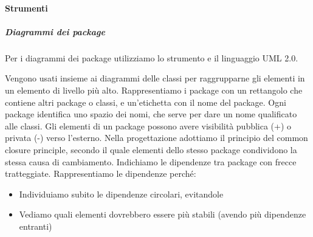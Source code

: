         \paragraph{Strumenti}

		\subparagraph{Diagrammi dei package}\label{PP:Sviluppo:DiagrammiPackage}
        Per i diagrammi dei package utilizziamo lo strumento  e il linguaggio UML 2.0.\par
        Vengono usati insieme ai diagrammi delle classi per raggrupparne gli elementi in un elemento di livello più alto.
        Rappresentiamo i package con un rettangolo che contiene altri package o classi, e un'etichetta con il nome del package.
        Ogni package identifica uno spazio dei nomi, che serve per dare un nome qualificato alle classi.
        Gli elementi di un package possono avere visibilità pubblica (+) o privata (-) verso l'esterno.
		Nella progettazione adottiamo il principio del common closure principle, secondo il quale elementi dello stesso
		package condividono la stessa causa di cambiamento.
        Indichiamo le dipendenze tra package con frecce tratteggiate.
        Rappresentiamo le dipendenze perché:
        \begin{itemize}
            \item Individuiamo subito le dipendenze circolari, evitandole
            \item Vediamo quali elementi dovrebbero essere più stabili (avendo più dipendenze entranti)
        \end{itemize}

